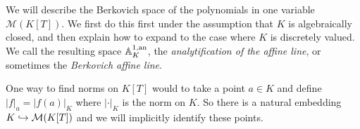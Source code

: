 We will describe the Berkovich space of the polynomials in one variable  $\mathcal{M} (K[T])$.
We first do this first under the assumption that $K$ is algebraically closed, and then explain how to expand to the case where $K$ is discretely valued.
We call the resulting space $\mathbb{A}_K^{1, \text{an}}$, the \emph{analytification of the affine line}, or sometimes the \emph{Berkovich affine line}. 

\medskip

One way to find norms on $K[T]$ would to take a point $a \in K$ and define $|f|_a = |f(a)|_K$ where $|\cdot |_K$ is the norm on $K$. 
So there is a natural embedding $K \hookrightarrow \mathcal{M}(K[T])$ and we will implicitly identify these points.  

